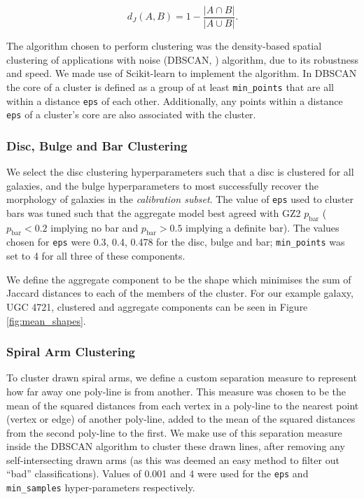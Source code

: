 \documentclass[../main.tex]{subfiles}
\begin{document}
\begin{equation}
d_J(A, B) = 1 - \frac{|A \cap B|}{|A \cup B|}.
\end{equation}

The algorithm chosen to perform clustering was the density-based spatial clustering of applications with noise (DBSCAN, \citealt{dbscan}) algorithm, due to its robustness and speed. We made use of Scikit-learn \citep{scikit-learn} to implement the algorithm. In DBSCAN the core of a cluster is defined as a group of at least \texttt{min\_points} that are all within a distance \texttt{eps} of each other. Additionally, any points within a distance \texttt{eps} of a cluster's core are also associated with the cluster.

\subsubsection{Disc, Bulge and Bar Clustering}

We select the disc clustering hyperparameters such that a disc is clustered for all galaxies, and the bulge hyperparameters to most successfully recover the morphology of galaxies in the \textit{calibration subset}. The value of \texttt{eps} used to cluster bars was tuned such that the aggregate model best agreed with GZ2 $p_\mathrm{bar}$ ($p_\mathrm{bar} < 0.2$ implying no bar and $p_\mathrm{bar} > 0.5$ implying a definite bar). The values chosen for \texttt{eps} were 0.3, 0.4, 0.478 for the disc, bulge and bar; \texttt{min\_points} was set to 4 for all three of these components.

We define the aggregate component to be the shape which minimises the sum of Jaccard distances to each of the members of the cluster. For our example galaxy, UGC 4721, clustered and aggregate components can be seen in Figure \ref{fig:mean_shapes}.

\subsubsection{Spiral Arm Clustering}
\label{sec:spiral_clustering}
To cluster drawn spiral arms, we define a custom separation measure to represent how far away one poly-line is from another. This measure was chosen to be the mean of the squared distances from each vertex in a poly-line to the nearest point (vertex or edge) of another poly-line, added to the mean of the squared distances from the second poly-line to the first. We make use of this separation measure inside the DBSCAN algorithm to cluster these drawn lines, after removing any self-intersecting drawn arms (as this was deemed an easy method to filter out ``bad'' classifications). Values of 0.001 and 4 were used for the \texttt{eps} and \texttt{min\_samples} hyper-parameters respectively.
\end{document}
